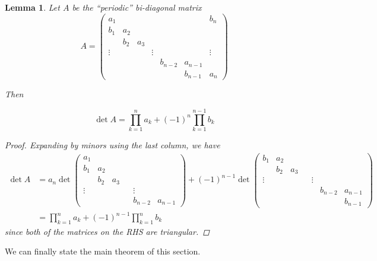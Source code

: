 \documentclass[12pt]{article}
\newtheorem{lemma}{Lemma}
\begin{document}

\begin{lemma}\label{bidiag}
Let $A$ be the ``periodic'' bi-diagonal matrix
\begin{equation}
A = \begin{pmatrix}
a_1 & & & & & & b_n \\
b_1 & a_2 \\
& b_2 & a_3 \\
\vdots & & & \vdots & &&  \vdots \\
& & & & b_{n-2} & a_{n-1} \\
& & & & & b_{n-1} & a_n
\end{pmatrix}
\end{equation}

Then 

\begin{equation}
\det{A} = \prod_{k = 1}^n a_k + (-1)^n \prod_{k = 1}^{n-1} b_k
\end{equation}

\begin{proof}
Expanding by minors using the last column, we have
\begin{align*}
\det A &= a_n \det
\begin{pmatrix}
a_1 \\
b_1 & a_2 \\
& b_2 & a_3 \\
\vdots & & & & \vdots \\
& & & & b_{n-2} & a_{n-1}
\end{pmatrix}
+ (-1)^{n-1} \det
\begin{pmatrix}
b_1 & a_2 \\
& b_2 & a_3 \\
\vdots & & & & \vdots \\
& & & & & b_{n-2} & a_{n-1} \\
& & & & & & b_{n-1}
\end{pmatrix} \\
&= \prod_{k = 1}^n a_k + (-1)^{n-1} \prod_{k = 1}^n b_k
\end{align*}
since both of the matrices on the RHS are triangular.
\end{proof}
\end{lemma}


We can finally state the main theorem of this section.
\end{document}
